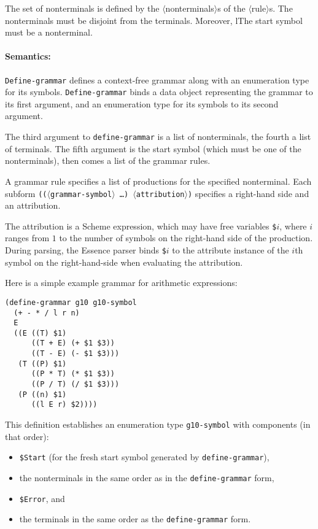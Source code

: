 \documentclass{article}
\newcommand{\meta}[1]{{\noindent\mbox{\textrm{$\langle$#1$\rangle$}}}}
\newcommand{\dotsfoo}{\ldots\texonly{\thinspace}}
\newcommand{\codefont}[1]{\texttt{#1}}
\begin{document}
The set of nonterminals is defined by the \meta{nonterminals}s of the
\meta{rule}s.  The nonterminals must be disjoint from the terminals.
Moreover, lThe start symbol must be a nonterminal.

\paragraph{Semantics:} \codefont{Define-grammar} defines a
context-free grammar along with an enumeration type for its symbols.
\codefont{Define-grammar} binds a data object representing the grammar 
to its first argument, and an enumeration type for its symbols to its
second argument.

The third argument to \codefont{define-grammar} is a list of
nonterminals, the fourth a list of terminals.  The fifth argument is
the start symbol (which must be one of the nonterminals), then comes a
list of the grammar rules.

A grammar rule specifies a list of productions for the specified
nonterminal.  Each subform \texttt{((\meta{grammar-symbol} \dotsfoo)
  \meta{attribution})}
specifies a right-hand side and an attribution.

The attribution is a Scheme expression, which may have free variables
\codefont{\$}$i$, where $i$ ranges from $1$ to the number of symbols
on the right-hand side of the production.  During parsing, the Essence
parser binds \codefont{\$}$i$ to the attribute instance of the $i$th
symbol on the right-hand-side when evaluating the attribution.

Here is a simple example grammar for arithmetic expressions:
%
\begin{verbatim}
(define-grammar g10 g10-symbol
  (+ - * / l r n)
  E
  ((E ((T) $1)
      ((T + E) (+ $1 $3))
      ((T - E) (- $1 $3)))
   (T ((P) $1)
      ((P * T) (* $1 $3))
      ((P / T) (/ $1 $3)))
   (P ((n) $1)
      ((l E r) $2))))
\end{verbatim}
%
This definition establishes an enumeration type \codefont{g10-symbol}
with components (in that order):
%
\label{list:grammar-enum}
%
\begin{itemize}
\item \codefont{\$Start} (for the fresh start symbol generated by
  \codefont{define-grammar}),
\item the nonterminals in the same order as in the
  \codefont{define-grammar} form,
\item \codefont{\$Error}, and
\item the terminals in the same order as the \codefont{define-grammar}
  form.
\end{itemize}
\end{document}

